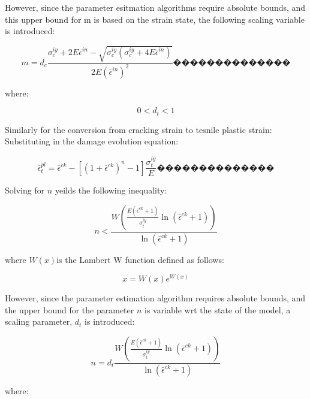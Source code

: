 However, since the parameter esitmation algorithms require absolute
bounds, and this upper bound for m is based on the strain state, the
following scaling variable is introduced:

\begin{equation}
m=d_{c}\frac{\sigma_{c}^{iy}+2E\bar{\epsilon}^{in}-\sqrt{\sigma_{c}^{iy}\left(\sigma_{c}^{iy}+4E\bar{\epsilon}^{in}\right)}}{2E\left(\bar{\epsilon}^{in}\right)^{2}}��������������\label{eqn:param14}
\end{equation}


where:

\begin{equation}
0<d_{t}<1\label{eqn:param15}
\end{equation}


Similarly for the conversion from cracking strain to tesnile plastic
strain: Substituting in the damage evolution equation:

\begin{equation}
\bar{\epsilon}_{t}^{pl}=\bar{\epsilon}^{ck}-\left[\left(1+\bar{\epsilon}^{ck}\right)^{n}-1\right]\frac{\sigma_{t}^{iy}}{E}��������������\label{eqn:param5-1}
\end{equation}


Solving for $n$ yeilds the following inequality:

\begin{equation}
n<\frac{W\left(\frac{E\left(\bar{\epsilon}^{ck}+1\right)}{\sigma_{t}^{iy}}\ln\left(\bar{\epsilon}^{ck}+1\right)\right)}{\ln\left(\bar{\epsilon}^{ck}+1\right)}\label{eqn:param7}
\end{equation}


where $W\left(x\right)$is the Lambert W function defined as follows:

\begin{equation}
x=W\left(x\right)e^{W(x)}\label{eqn:param8}
\end{equation}


However, since the parameter estimation algorithm requires absolute
bounds, and the upper bound for the parameter $n$ is variable wrt
the state of the model, a scaling parameter, $d_{t}$ is introduced:

\begin{equation}
n=d_{t}\frac{W\left(\frac{E\left(\bar{\epsilon}^{ck}+1\right)}{\sigma_{t}^{iy}}\ln\left(\bar{\epsilon}^{ck}+1\right)\right)}{\ln\left(\bar{\epsilon}^{ck}+1\right)}\label{eqn:param9}
\end{equation}


where:

